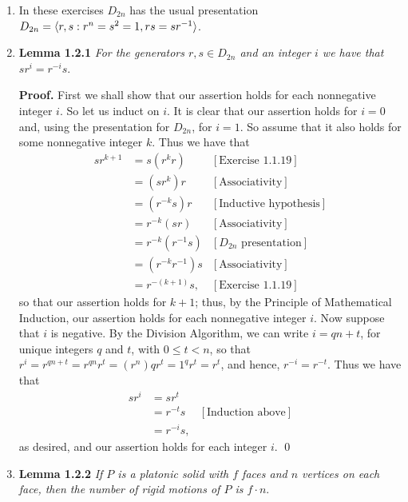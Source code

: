 \begin{enumerate}
   \item[]        In these exercises $D_{2n}$ has the usual presentation
                  $D_{2n} = \langle r, s : r^n = s^2 = 1, rs = sr^{-1} \rangle$.
   \item[]        \textbf{Lemma 1.2.1} \textit{For the generators
                  $r, s \in D_{2n}$ and an integer $i$ we have that
                  $sr^i = r^{-i}s$}.
                  
      \textbf{Proof.} First we shall show that our assertion holds for each
      nonnegative integer $i$. So let us induct on $i$. It is clear that our
      assertion holds for $i = 0$ and, using the presentation for $D_{2n}$, for
      $i = 1$. So assume that it also holds for some nonnegative integer $k$.
      Thus we have that
      \begin{align*}
         sr^{k + 1} &= s(r^kr) &[\text{Exercise 1.1.19}] \\
                    &= (sr^k)r &[\text{Associativity}] \\
                    &= (r^{-k}s)r &[\text{Inductive hypothesis}] \\
                    &= r^{-k}(sr) &[\text{Associativity}] \\
                    &= r^{-k}(r^{-1}s) &[D_{2n} \text{ presentation}] \\
                    &= (r^{-k}r^{-1})s &[\text{Associativity}] \\
                    &= r^{-(k+1)}s, &[\text{Exercise 1.1.19}]
      \end{align*}
      so that our assertion holds for $k + 1$; thus, by the Principle of 
      Mathematical Induction, our assertion holds for each nonnegative integer 
      $i$. Now suppose that $i$ is negative. By the Division Algorithm, we can 
      write $i = qn + t$, for unique integers $q$ and $t$, with $0 \le t < n$, 
      so that $r^i = r^{qn+t} = r^{qn}r^t = (r^n)qr^t = 1^qr^t = r^t$, and 
      hence, $r^{-i} = r^{-t}$. Thus we have that
      \begin{align*}
         sr^i &= sr^t \\
              &= r^{-t}s &[\text{Induction above}] \\
              &= r^{-i}s,
      \end{align*}
      as desired, and our assertion holds for each integer $i$. \qed
   \item[]        \textbf{Lemma 1.2.2} \textit{If $P$ is a platonic solid with
                  $f$ faces and $n$ vertices on each face, then the number of
                  rigid motions of $P$ is $f \cdot n$}.
                  

\end{enumerate}
